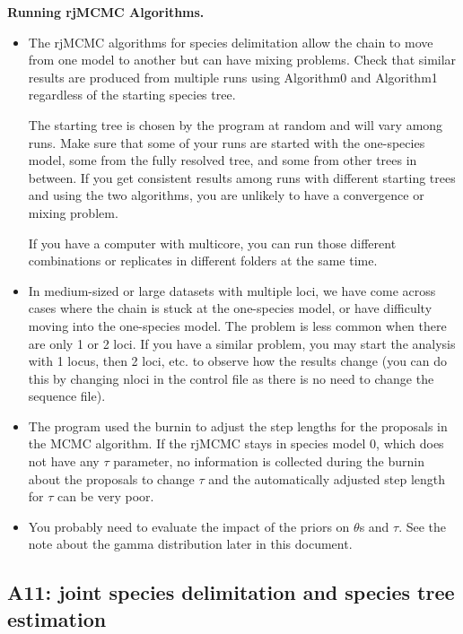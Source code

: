 \documentclass{book}
\numberwithin{equation}{section} \renewcommand{\baselinestretch}{0.55}
\begin{document}
\begin{mdframed}
  \textbf{Running rjMCMC Algorithms.}
  \begin{itemize}
  \item The rjMCMC algorithms for species delimitation allow the chain
    to move from one model to another but can have mixing problems.
    Check that similar results are produced from multiple runs using
    Algorithm0 and Algorithm1 regardless of the starting species tree.

    The starting tree is chosen by the program at random and will vary
    among runs.  Make sure that some of your runs are started with the
    one-species model, some from the fully resolved tree, and some
    from other trees in between.  If you get consistent results among
    runs with different starting trees and using the two algorithms,
    you are unlikely to have a convergence or mixing problem.

    If you have a computer with multicore, you can run those different
    combinations or replicates in different folders at the same time.

  \item In medium-sized or large datasets with multiple loci, we have
    come across cases where the chain is stuck at the one-species
    model, or have difficulty moving into the one-species model.  The
    problem is less common when there are only 1 or 2 loci.  If you
    have a similar problem, you may start the analysis with 1 locus,
    then 2 loci, etc. to observe how the results change (you can do
    this by changing nloci in the control file as there is no need to
    change the sequence file).

  \item The program used the burnin to adjust the step lengths for the
    proposals in the MCMC algorithm.  If the rjMCMC stays in species
    model 0, which does not have any $\tau$ parameter, no information
    is collected during the burnin about the proposals to change
    $\tau$ and the automatically adjusted step length for $\tau$ can
    be very poor.

  \item You probably need to evaluate the impact of the priors on
    $\theta$s and $\tau$.  See the note about the gamma distribution
    later in this document.
  \end{itemize}
\end{mdframed}

\subsection{A11: joint species delimitation and species tree
  estimation}
\end{document}
